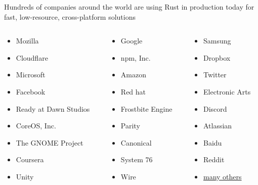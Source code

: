 \begin{frame}{\insertsubsection}

  Hundreds of companies around the world are using Rust in production today for
  fast, low-resource, cross-platform solutions

  \begin{columns}
    \begin{column}{.33\textwidth}
      \begin{itemize}
      \item Mozilla
      \item Cloudflare
      \item Microsoft
      \item Facebook
      \item Ready at Dawn Studios
      \item CoreOS, Inc.
      \item The GNOME Project
      \item Coursera
      \item Unity
      \end{itemize}
    \end{column}
    \begin{column}{.33\textwidth}
      \begin{itemize}
      \item Google
      \item npm, Inc.
      \item Amazon
      \item Red hat
      \item Frostbite Engine
      \item Parity
      \item Canonical
      \item System 76
      \item Wire
      \end{itemize}
    \end{column}
    \begin{column}{.33\textwidth}
      \begin{itemize}
      \item Samsung
      \item Dropbox
      \item Twitter
      \item Electronic Arts
      \item Discord
      \item Atlassian
      \item Baidu
      \item Reddit
      \item \href{https://www.rust-lang.org/production/users}{many others}
      \end{itemize}
    \end{column}
  \end{columns}


\end{frame}
